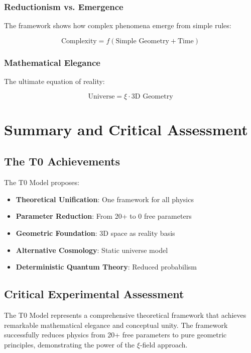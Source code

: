 \documentclass[12pt,a4paper]{report}
\begin{document}
	\subsection{Reductionism vs. Emergence}
	
	The framework shows how complex phenomena emerge from simple rules:
	
	\begin{equation}
		\text{Complexity} = f(\text{Simple Geometry} + \text{Time})
	\end{equation}
	
	\subsection{Mathematical Elegance}
	
	The ultimate equation of reality:
	
	\begin{equation}
		\boxed{\text{Universe} = \xi \cdot \text{3D Geometry}}
	\end{equation}
	
	\chapter{Summary and Critical Assessment}
	
	\section{The T0 Achievements}
	
	The T0 Model proposes:
	
	\begin{itemize}
		\item \textbf{Theoretical Unification}: One framework for all physics
		\item \textbf{Parameter Reduction}: From 20+ to 0 free parameters
		\item \textbf{Geometric Foundation}: 3D space as reality basis
		\item \textbf{Alternative Cosmology}: Static universe model
		\item \textbf{Deterministic Quantum Theory}: Reduced probabilism
	\end{itemize}
	
	\section{Critical Experimental Assessment}
	
	The T0 Model represents a comprehensive theoretical framework that achieves remarkable mathematical elegance and conceptual unity. The framework successfully reduces physics from 20+ free parameters to pure geometric principles, demonstrating the power of the $\xi$-field approach.
	
\end{document}
